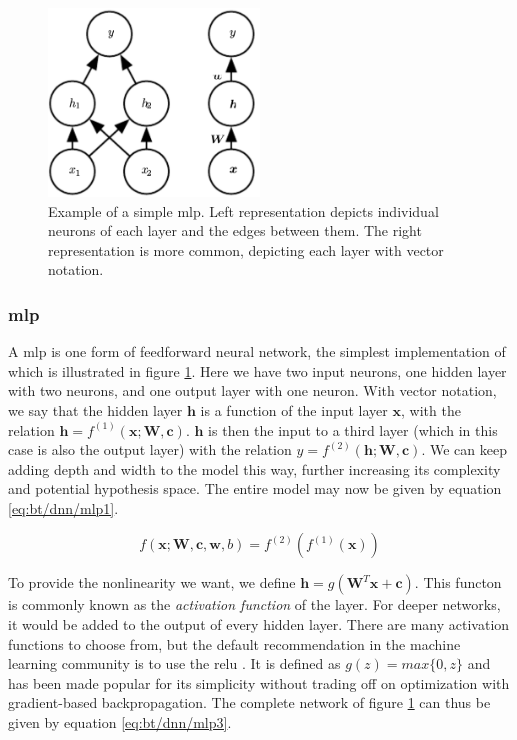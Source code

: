 \begin{figure}[h]
    \centering
    \includegraphics[width=0.5\textwidth]{figures/bt_dfnn.png}
    \caption{Example of a simple \acrshort{mlp}. Left representation depicts individual neurons of each layer and the edges between them. The right representation is more common, depicting each layer with vector notation. }
    \label{fig:bt_dfnn}
\end{figure}

\subsubsection{\acrlong{mlp}}

A \acrfull{mlp} is one form of feedforward neural network, the simplest implementation of which is illustrated in figure \ref{fig:bt_dfnn}. Here we have two input neurons, one hidden layer with two neurons, and one output layer with one neuron. With vector notation, we say that the hidden layer $\bm{h}$ is a function of the input layer $\bm{x}$, with the relation $\bm{h}=f^{(1)}(\bm{x};\bm{W}, \bm{c})$. $\bm{h}$ is then the input to a third layer (which in this case is also the output layer) with the relation $y=f^{(2)}(\bm{h};\bm{W}, \bm{c})$. We can keep adding depth and width to the model this way, further increasing its complexity and potential hypothesis space. The entire model may now be given by equation \ref{eq:bt/dnn/mlp1}.

\begin{equation}
    \label{eq:bt/dnn/mlp1}
    f(\bm{x};\bm{W},\bm{c},\bm{w},b)=f^{(2)}(f^{(1)}(\bm{x}))
\end{equation}

To provide the nonlinearity we want, we define $\bm{h}=g(\bm{W}^T\bm{x}+\bm{c})$. This functon is commonly known as the \textit{activation function} of the layer. For deeper networks, it would be added to the output of every hidden layer. There are many activation functions to choose from, but the default recommendation in the machine learning community is to use the \acrfull{relu} \cite{agarap2018}. It is defined as $g(z)=max\{0,z\}$ and has been made popular for its simplicity without trading off on optimization with gradient-based backpropagation. The complete network of figure \ref{fig:bt_dfnn} can thus be given by equation \ref{eq:bt/dnn/mlp3}.

